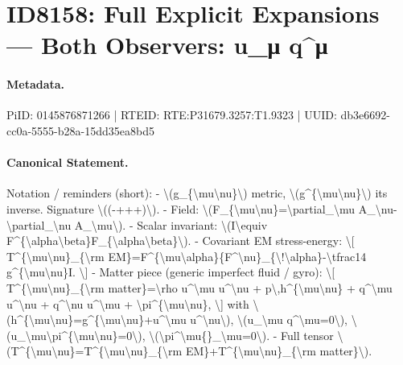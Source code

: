 \section*{ID8158: Full Explicit Expansions — Both Observers: u\_μ q\textasciicircum{}μ}
\paragraph{Metadata.}
PiID: 0145876871266 | RTEID: RTE:P31679.3257:T1.9323 | UUID: db3e6692-cc0a-5555-b28a-15dd35ea8bd5

\paragraph{Canonical Statement.}
Notation / reminders (short): - \textbackslash{}(g\_\{\textbackslash{}mu\textbackslash{}nu\}\textbackslash{}) metric, \textbackslash{}(g\textasciicircum{}\{\textbackslash{}mu\textbackslash{}nu\}\textbackslash{}) its inverse. Signature \textbackslash{}((-+++)\textbackslash{}). - Field: \textbackslash{}(F\_\{\textbackslash{}mu\textbackslash{}nu\}=\textbackslash{}partial\_\textbackslash{}mu A\_\textbackslash{}nu-\textbackslash{}partial\_\textbackslash{}nu A\_\textbackslash{}mu\textbackslash{}). - Scalar invariant: \textbackslash{}(I\textbackslash{}equiv F\textasciicircum{}\{\textbackslash{}alpha\textbackslash{}beta\}F\_\{\textbackslash{}alpha\textbackslash{}beta\}\textbackslash{}). - Covariant EM stress-energy: \textbackslash{}[ T\textasciicircum{}\{\textbackslash{}mu\textbackslash{}nu\}\_\{\textbackslash{}rm EM\}=F\textasciicircum{}\{\textbackslash{}mu\textbackslash{}alpha\}\{F\textasciicircum{}\textbackslash{}nu\}\_\{\textbackslash{}!\textbackslash{}alpha\}-\textbackslash{}tfrac14 g\textasciicircum{}\{\textbackslash{}mu\textbackslash{}nu\}I. \textbackslash{}] - Matter piece (generic imperfect fluid / gyro): \textbackslash{}[ T\textasciicircum{}\{\textbackslash{}mu\textbackslash{}nu\}\_\{\textbackslash{}rm matter\}=\textbackslash{}rho u\textasciicircum{}\textbackslash{}mu u\textasciicircum{}\textbackslash{}nu + p\textbackslash{},h\textasciicircum{}\{\textbackslash{}mu\textbackslash{}nu\} + q\textasciicircum{}\textbackslash{}mu u\textasciicircum{}\textbackslash{}nu + q\textasciicircum{}\textbackslash{}nu u\textasciicircum{}\textbackslash{}mu + \textbackslash{}pi\textasciicircum{}\{\textbackslash{}mu\textbackslash{}nu\}, \textbackslash{}] with \textbackslash{}(h\textasciicircum{}\{\textbackslash{}mu\textbackslash{}nu\}=g\textasciicircum{}\{\textbackslash{}mu\textbackslash{}nu\}+u\textasciicircum{}\textbackslash{}mu u\textasciicircum{}\textbackslash{}nu\textbackslash{}), \textbackslash{}(u\_\textbackslash{}mu q\textasciicircum{}\textbackslash{}mu=0\textbackslash{}), \textbackslash{}(u\_\textbackslash{}mu\textbackslash{}pi\textasciicircum{}\{\textbackslash{}mu\textbackslash{}nu\}=0\textbackslash{}), \textbackslash{}(\textbackslash{}pi\textasciicircum{}\textbackslash{}mu\{\}\_\textbackslash{}mu=0\textbackslash{}). - Full tensor \textbackslash{}(T\textasciicircum{}\{\textbackslash{}mu\textbackslash{}nu\}=T\textasciicircum{}\{\textbackslash{}mu\textbackslash{}nu\}\_\{\textbackslash{}rm EM\}+T\textasciicircum{}\{\textbackslash{}mu\textbackslash{}nu\}\_\{\textbackslash{}rm matter\}\textbackslash{}).

